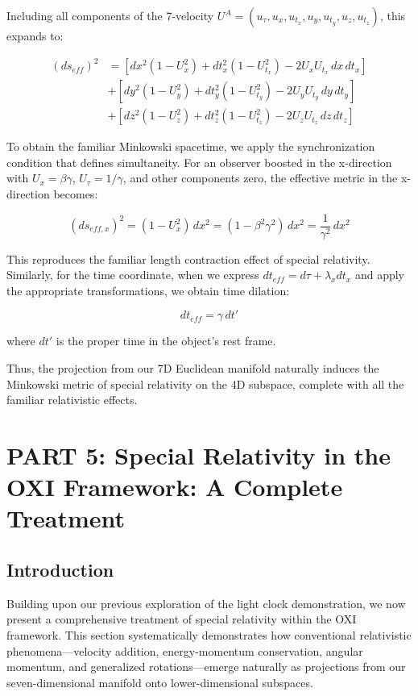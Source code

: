 \documentclass{article}
\begin{document}
Including all components of the 7-velocity $U^A = (u_\tau, u_x, u_{t_x}, u_y, u_{t_y}, u_z, u_{t_z})$, this expands to:

\begin{align}
(ds_{eff})^2 &= [dx^2(1-U_x^2) + dt_x^2(1-U_{t_x}^2) - 2U_x U_{t_x} \, dx \, dt_x] \\
&+ [dy^2(1-U_y^2) + dt_y^2(1-U_{t_y}^2) - 2U_y U_{t_y} \, dy \, dt_y] \\
&+ [dz^2(1-U_z^2) + dt_z^2(1-U_{t_z}^2) - 2U_z U_{t_z} \, dz \, dt_z]
\end{align}

To obtain the familiar Minkowski spacetime, we apply the synchronization condition that defines simultaneity. For an observer boosted in the x-direction with $U_x = \beta\gamma$, $U_\tau = 1/\gamma$, and other components zero, the effective metric in the x-direction becomes:

\begin{equation}
(ds_{eff,x})^2 = (1-U_x^2) \, dx^2 = (1-\beta^2\gamma^2) \, dx^2 = \frac{1}{\gamma^2} \, dx^2
\end{equation}

This reproduces the familiar length contraction effect of special relativity. Similarly, for the time coordinate, when we express $dt_{eff} = d\tau + \lambda_x dt_x$ and apply the appropriate transformations, we obtain time dilation:

\begin{equation}
dt_{eff} = \gamma \, dt'
\end{equation}

where $dt'$ is the proper time in the object's rest frame.

Thus, the projection from our 7D Euclidean manifold naturally induces the Minkowski metric of special relativity on the 4D subspace, complete with all the familiar relativistic effects.\section{PART 5: Special Relativity in the OXI Framework: A Complete Treatment}

\subsection{Introduction}

Building upon our previous exploration of the light clock demonstration, we now present a comprehensive treatment of special relativity within the OXI framework. This section systematically demonstrates how conventional relativistic phenomena—velocity addition, energy-momentum conservation, angular momentum, and generalized rotations—emerge naturally as projections from our seven-dimensional manifold onto lower-dimensional subspaces.
\end{document}
